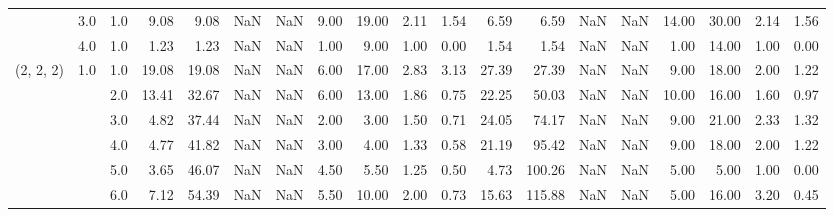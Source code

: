 \begin{tabular}{lllrrrrrrrrrrrrrrrr}
          & 3.0 & 1.0  &      9.08 &       9.08 &               NaN &                NaN &  9.00 &  19.00 &             2.11 &                         1.54 &      6.59 &       6.59 &               NaN &                NaN & 14.00 &  30.00 &             2.14 &                         1.56 \\
          & 4.0 & 1.0  &      1.23 &       1.23 &               NaN &                NaN &  1.00 &   9.00 &             1.00 &                         0.00 &      1.54 &       1.54 &               NaN &                NaN &  1.00 &  14.00 &             1.00 &                         0.00 \\
(2, 2, 2) & 1.0 & 1.0  &     19.08 &      19.08 &               NaN &                NaN &  6.00 &  17.00 &             2.83 &                         3.13 &     27.39 &      27.39 &               NaN &                NaN &  9.00 &  18.00 &             2.00 &                         1.22 \\
          &     & 2.0  &     13.41 &      32.67 &               NaN &                NaN &  6.00 &  13.00 &             1.86 &                         0.75 &     22.25 &      50.03 &               NaN &                NaN & 10.00 &  16.00 &             1.60 &                         0.97 \\
          &     & 3.0  &      4.82 &      37.44 &               NaN &                NaN &  2.00 &   3.00 &             1.50 &                         0.71 &     24.05 &      74.17 &               NaN &                NaN &  9.00 &  21.00 &             2.33 &                         1.32 \\
          &     & 4.0  &      4.77 &      41.82 &               NaN &                NaN &  3.00 &   4.00 &             1.33 &                         0.58 &     21.19 &      95.42 &               NaN &                NaN &  9.00 &  18.00 &             2.00 &                         1.22 \\
          &     & 5.0  &      3.65 &      46.07 &               NaN &                NaN &  4.50 &   5.50 &             1.25 &                         0.50 &      4.73 &     100.26 &               NaN &                NaN &  5.00 &   5.00 &             1.00 &                         0.00 \\
          &     & 6.0  &      7.12 &      54.39 &               NaN &                NaN &  5.50 &  10.00 &             2.00 &                         0.73 &     15.63 &     115.88 &               NaN &                NaN &  5.00 &  16.00 &             3.20 &                         0.45 \\

\end{tabular}
